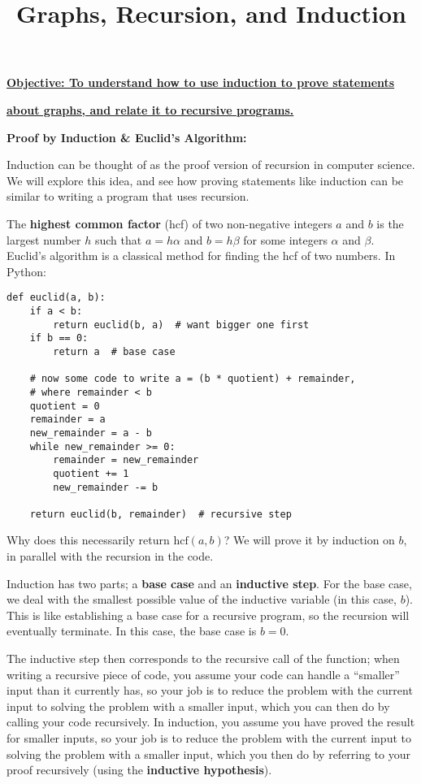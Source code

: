 \documentclass{article}
\begin{document}
\title{Graphs, Recursion, and Induction}
\date{}

\maketitle
\thispagestyle{empty}

\Large

\textbf{\underline{Objective: To understand how to use induction to prove statements}}

\textbf{\underline{about graphs, and relate it to recursive programs.}}


\vspace{5mm}


\textbf{Proof by Induction \& Euclid's Algorithm:}\bigskip



Induction can be thought of as the proof version of recursion in computer science. We will explore this idea, and see how proving statements like induction can be similar to writing a program that uses recursion.\medskip

The \textbf{highest common factor} (hcf) of two non-negative integers $a$ and $b$ is the largest number $h$ such that $a=h\alpha$ and $b=h\beta$ for some integers $\alpha$ and $\beta$. Euclid's algorithm is a classical method for finding the hcf of two numbers. In Python:
\begin{Verbatim}
def euclid(a, b):
	if a < b:
		return euclid(b, a)  # want bigger one first
	if b == 0:
		return a  # base case
	
	# now some code to write a = (b * quotient) + remainder,
	# where remainder < b
	quotient = 0
	remainder = a
	new_remainder = a - b
	while new_remainder >= 0:
		remainder = new_remainder
		quotient += 1
		new_remainder -= b
	
	return euclid(b, remainder)  # recursive step
\end{Verbatim}


Why does this necessarily return $\mathrm{hcf}(a,b)$? We will prove it by induction on $b$, in parallel with the recursion in the code.

Induction has two parts; a \textbf{base case} and an \textbf{inductive step}. For the base case, we deal with the smallest possible value of the inductive variable (in this case, $b$). This is like establishing a base case for a recursive program, so the recursion will eventually terminate. In this case, the base case is $b=0$.

The inductive step then corresponds to the recursive call of the function; when writing a recursive piece of code, you assume your code can handle a ``smaller'' input than it currently has, so your job is to reduce the problem with the current input to solving the problem with a smaller input, which you can then do by calling your code recursively. In induction, you assume you have proved the result for smaller inputs, so your job is to reduce the problem with the current input to solving the problem with a smaller input, which you then do by referring to your proof recursively (using the \textbf{inductive hypothesis}).
\end{document}
